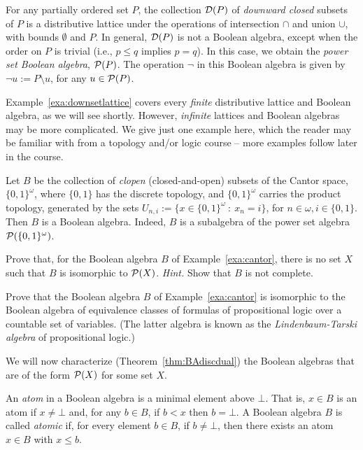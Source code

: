 \begin{example}\label{exa:downsetlattice}
  For any partially ordered set $P$, the collection $\mathcal{D}(P)$ of \emph{downward closed} subsets of $P$ is a distributive lattice under the operations of intersection $\cap$ and union $\cup$, with bounds $\emptyset$ and $P$. In general, $\mathcal{D}(P)$ is not a Boolean algebra, except when the order on $P$ is trivial (i.e., $p \leq q$ implies $p = q$). In this case, we obtain the \emph{power set Boolean algebra}, $\mathcal{P}(P)$. The operation $\neg$ in this Boolean algebra is given by $\neg u := P \setminus u$, for any $u \in \mathcal{P}(P)$.
\end{example}
Example~\ref{exa:downsetlattice} covers every \emph{finite} distributive lattice and Boolean algebra, as we will see shortly. However, \emph{infinite} lattices and Boolean algebras may be more complicated. We give just one example here, which the reader may be familiar with from a topology and/or logic course -- more examples follow later in the course.
\begin{example}\label{exa:cantor}
Let $B$ be the collection of \emph{clopen} (closed-and-open) subsets of the Cantor space, $\{0,1\}^\omega$, where $\{0,1\}$ has the discrete topology, and $\{0,1\}^\omega$ carries the product topology, generated by the sets $U_{n,i} := \{x \in \{0,1\}^\omega \ \colon \ x_n = i\}$, for $n \in \omega, i \in \{0,1\}$. Then $B$ is a Boolean algebra. Indeed, $B$ is a subalgebra of the power set algebra $\mathcal{P}(\{0,1\}^\omega)$. 
\end{example}
\begin{exercise}\easy
Prove that, for the Boolean algebra $B$ of Example~\ref{exa:cantor}, there is no set $X$ such that $B$ is isomorphic to $\mathcal{P}(X)$. {\it Hint.} Show that $B$ is not complete.
\end{exercise}
\begin{exercise}\medium
Prove that the Boolean algebra $B$ of Example~\ref{exa:cantor} is isomorphic to the Boolean algebra of equivalence classes of formulas of propositional logic over a countable set of variables. (The latter algebra is known as the \emph{Lindenbaum-Tarski algebra} of propositional logic.)
\end{exercise}
We will now characterize (Theorem~\ref{thm:BAdiscdual}) the Boolean algebras that are of the form $\mathcal{P}(X)$ for some set $X$.
\begin{definition}
An \emph{atom} in a Boolean algebra is a minimal element above $\bot$. That is, $x \in B$ is an atom if $x \neq \bot$ and, for any $b \in B$, if $b < x$ then $b = \bot$. 
A Boolean algebra $B$ is called \emph{atomic} if, for every element $b \in B$, if $b \neq \bot$, then there exists an atom $x \in B$ with $x \leq b$.
\end{definition}

